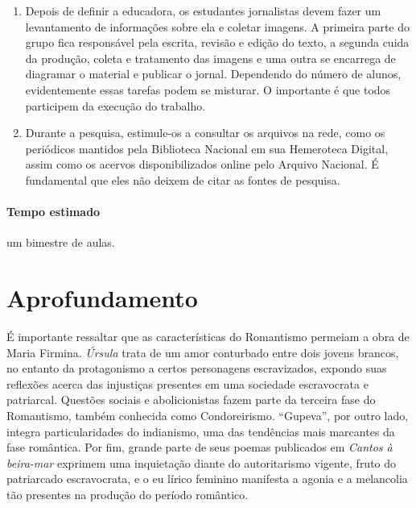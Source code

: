 \documentclass[12pt]{extarticle}
\begin{document}
\begin{enumerate}
\item
Depois de definir a educadora, os estudantes jornalistas devem fazer
um levantamento de informações sobre ela e coletar imagens. A primeira
parte do grupo fica responsável pela escrita, revisão e edição do texto,
a segunda cuida da produção, coleta e tratamento das imagens e uma outra
se encarrega de diagramar o material e publicar o jornal. Dependendo do
número de alunos, evidentemente essas tarefas podem se misturar. O
importante é que todos participem da execução do trabalho.

\item
Durante a pesquisa, estimule-os a consultar os arquivos na rede, como
os periódicos mantidos pela Biblioteca Nacional em sua Hemeroteca
Digital, assim como os acervos disponibilizados online pelo Arquivo
Nacional. É fundamental que eles não deixem de citar as fontes de
pesquisa.
\end{enumerate}

\paragraph{Tempo estimado} um bimestre de aulas.

\section{Aprofundamento}

É importante ressaltar que as características do Romantismo permeiam a
obra de Maria Firmina. \emph{Úrsula} trata de um amor conturbado entre
dois jovens brancos, no entanto da protagonismo a certos personagens
escravizados, expondo suas reflexões acerca das injustiças presentes em
uma sociedade escravocrata e patriarcal. Questões sociais e
abolicionistas fazem parte da terceira fase do Romantismo, também
conhecida como Condoreirismo. ``Gupeva'', por outro lado, integra
particularidades do indianismo, uma das tendências mais marcantes da
fase romântica. Por fim, grande parte de seus poemas publicados em
\emph{Cantos à beira-mar} exprimem uma inquietação diante do
autoritarismo vigente, fruto do patriarcado escravocrata, e o eu lírico
feminino manifesta a agonia e a melancolia tão presentes na produção do
período romântico.


\end{document}
